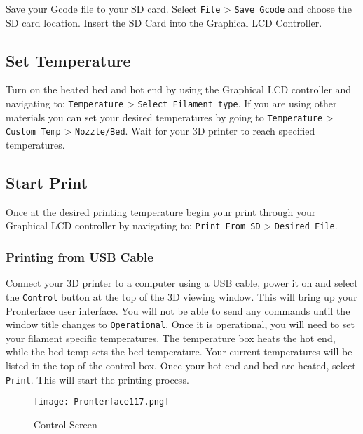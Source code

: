 Save your Gcode file to your SD card. Select \texttt{File} > \texttt{Save Gcode} and choose the SD card location. Insert the SD Card into the Graphical LCD Controller. 

\subsection{Set Temperature}

Turn on the heated bed and hot end by using the Graphical LCD controller and navigating to: \texttt{Temperature} > \texttt{Select Filament type}. If you are using other materials you can set your desired temperatures by going to \texttt{Temperature} > \texttt{Custom Temp} > \texttt{Nozzle/Bed}. Wait for your 3D printer to reach specified temperatures.

\subsection{Start Print}
Once at the desired printing temperature begin your print through your Graphical LCD controller by navigating to: \texttt{Print From SD} > \texttt{Desired File}.


\subsubsection{Printing from USB Cable}

Connect your 3D printer to a computer using a USB cable, power it on and select the \texttt{Control} button at the top of the 3D viewing window. This will bring up your Pronterface user interface. You will not be able to send any commands until the window title changes to \texttt{Operational}. Once it is operational, you will need to set your filament specific temperatures. The temperature box heats the hot end, while the bed temp sets the bed temperature. Your current temperatures will be listed in the top of the control box. Once your hot end and bed are heated, select \texttt{Print}. This will start the printing process.

\begin{figure}[H]
\centering
\texttt{[image: Pronterface117.png]}
\caption{Control Screen}
\label{fig:Control}
\end{figure}


